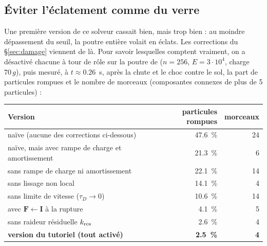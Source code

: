 \documentclass[11pt,a4paper]{article}
\newcommand{\code}[1]{\texttt{\detokenize{#1}}}
\begin{document}
\subsection{Éviter l'éclatement \og comme du verre \fg{}}
\label{sec:shatter}

Une première version de ce solveur cassait bien, mais trop bien : au moindre dépassement du seuil,
la poutre entière volait en éclats. Les corrections du \S\ref{sec:damage} viennent de là. Pour
savoir lesquelles comptent vraiment, on a désactivé chacune à tour de rôle sur la poutre de
\code{MpM/main.py} ($n = 256$, $E = 3\cdot10^4$, charge $70\,g$), puis mesuré, à $t \approx 0.26$~s,
après la chute et le choc contre le sol, la part de particules rompues et le nombre de morceaux
(composantes connexes de plus de 5 particules) :

\begin{center}
\begin{tabular}{@{}lrr@{}}
\toprule
Version & particules rompues & morceaux \\
\midrule
naïve (aucune des corrections ci-dessous) & 47.6~\% & 24 \\
naïve, mais avec rampe de charge et amortissement & 21.3~\% & 6 \\
sans rampe de charge ni amortissement & 22.1~\% & 14 \\
sans lissage non local & 14.1~\% & 4 \\
sans limite de vitesse ($\tau_D \to 0$) & 10.6~\% & 14 \\
avec $\mathbf F \leftarrow \mathbf I$ à la rupture & 4.1~\% & 5 \\
sans raideur résiduelle $k_{\rm res}$ & 2.6~\% & 4 \\
\textbf{version du tutoriel (tout activé)} & \textbf{2.5~\%} & \textbf{4} \\
\bottomrule
\end{tabular}
\end{center}
\end{document}
